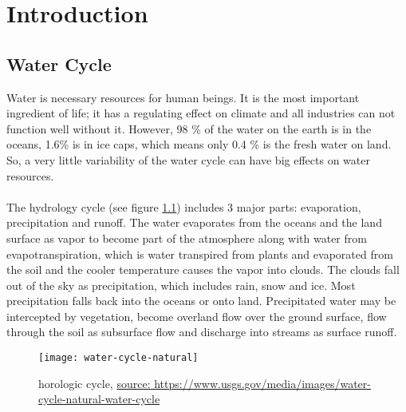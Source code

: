 \chapter{Introduction}
\section{Water Cycle}
Water is necessary resources for human beings. It is the most important ingredient of life; it has
a regulating effect on climate and all industries can not function well without it. However, 98 \%
of the water on the earth is in the oceans, 1.6\% is in ice caps, which means only 0.4 \% is the
fresh water on land. So, a very little variability of the water cycle can have big effects on
water resources. \\\\
The hydrology cycle (see figure \ref{fig:hydrologic cycle}) includes 3 major parts: evaporation, precipitation and runoff. The water evaporates from the oceans and the land surface as vapor to become part of the atmosphere along with water from evapotranspiration, which is water transpired from plants and evaporated from the soil and the cooler temperature causes the vapor into clouds. The clouds fall out of the sky as precipitation, which includes rain, snow and ice. Most precipitation falls back into the oceans or onto land. Precipitated water may be intercepted by vegetation, become overland flow over the ground surface, flow through the soil as subsurface flow and discharge into streams as surface runoff. 
\begin{figure}[htbp]
	\centering
	\texttt{[image: water-cycle-natural]} %
	\caption{horologic cycle, \href{https://www.usgs.gov/media/images/water-cycle-natural-water-cycle}{source: https://www.usgs.gov/media/images/water-cycle-natural-water-cycle}} 
	\label{fig:hydrologic cycle}
\end{figure}\\
